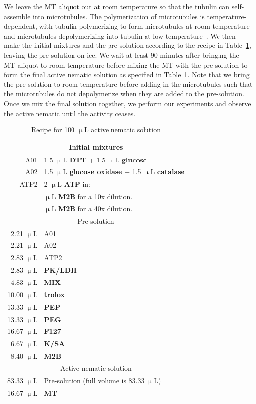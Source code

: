We leave the MT aliquot out at room temperature so that the tubulin can self-assemble into microtubules.
The polymerization of microtubules is temperature-dependent, with tubulin polymerizing to form microtubules at room temperature and microtubules depolymerizing into tubulin at low temperature~\cite{RN3}.
We then make the initial mixtures and the pre-solution according to the recipe in Table~\ref{t:3-recipe}, leaving the pre-solution on ice.
We wait at least 90 minutes after bringing the MT aliquot to room temperature before mixing the MT with the pre-solution to form the final active nematic solution as specified in Table~\ref{t:3-recipe}.
Note that we bring the pre-solution to room temperature before adding in the microtubules such that the microtubules do not depolymerize when they are added to the pre-solution.
Once we mix the final solution together, we perform our experiments and observe the active nematic until the activity ceases.

\begin{table}[ht]
  \centering
  \caption{Recipe for 100 $\upmu$L active nematic solution}
  \begin{tabular}{|r l|}
    \hline
    \multicolumn{2}{|c|}{Initial mixtures}\\
    \hline
    A01 & 1.5 $\upmu$L {\bf DTT} + 1.5 $\upmu$L {\bf glucose} \\
    A02 & 1.5 $\upmu$L {\bf glucose oxidase} + 1.5 $\upmu$L {\bf catalase} \\
    ATP2 & 2 $\upmu$L {\bf ATP} in:\\
    & \quad 18 $\upmu$L {\bf M2B} for a 10x dilution.\\
    & \quad 38 $\upmu$L {\bf M2B} for a 40x dilution.\\
    \hline
    \multicolumn{2}{|c|}{Pre-solution}\\
    \hline
    2.21 $\upmu$L & A01\\
    2.21 $\upmu$L & A02\\
    2.83 $\upmu$L & ATP2\\
    2.83 $\upmu$L & {\bf PK/LDH} \\
    4.83 $\upmu$L & {\bf MIX}\\
    10.00 $\upmu$L & {\bf trolox}\\
    13.33 $\upmu$L & {\bf PEP}\\
    13.33 $\upmu$L & {\bf PEG}\\
    16.67 $\upmu$L & {\bf F127}\\
    6.67 $\upmu$L & {\bf K/SA}\\
    8.40 $\upmu$L & {\bf M2B}\\
    \hline
    \multicolumn{2}{|c|}{Active nematic solution}\\
    \hline
    83.33 $\upmu$L & Pre-solution (full volume is 83.33 $\upmu$L)\\
    16.67 $\upmu$L & {\bf MT}\\
    \hline
  \end{tabular}
  \label{t:3-recipe}
\end{table}



